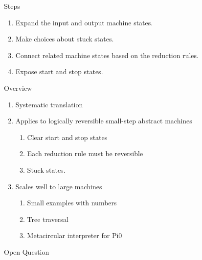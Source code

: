 \documentclass[svgnames,11pt]{beamer}
\begin{document}
\begin{frame}{Steps}

  \begin{enumerate}
\vfill
\item Expand the input and output machine states.
\vfill
\item Make choices about stuck states. 
\vfill
\item Connect related machine states based on the reduction rules.
\vfill
\item Expose start and stop states. 
  \end{enumerate}
\vfill

\end{frame}


\begin{frame}{Overview}

  \begin{enumerate}
\vfill
  \item Systematic translation
\vfill
  \item Applies to logically reversible small-step abstract machines
    \begin{enumerate}
    \item Clear start and stop states
    \item Each reduction rule must be reversible
    \item Stuck states.
    \end{enumerate}
\vfill
  \item Scales well to large machines
    \begin{enumerate}
    \item Small examples with numbers
    \item Tree traversal
    \item Metacircular interpreter for {{Pi0}}
    \end{enumerate}

  \end{enumerate}
\vfill

\end{frame}




\begin{frame}{Open Question}

\end{frame}
\end{document}
